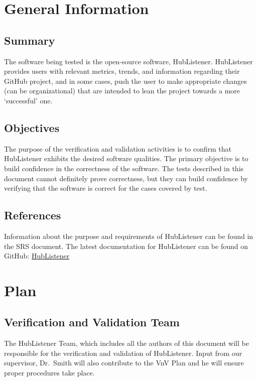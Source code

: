 \documentclass[12pt, titlepage]{article}
\begin{document}
\section{General Information}

\subsection{Summary}
The software being tested is the open-source software, HubListener.  HubListener provides users with relevant metrics, trends, and
information regarding their GitHub project, and in some cases, push the user to make appropriate changes (can be organizational) that are intended to lean the project towards a more `successful' one.

\subsection{Objectives}
The purpose of the verification and validation activities is to confirm that HubListener exhibits the desired software qualities. The primary objective is to build confidence in the correctness of the software. The tests described in this document cannot definitely prove correctness, but they can build confidence by verifying that the software is correct for the cases covered by test. 
\subsection{References}

Information about the purpose and requirements of HubListener can be found in the SRS document. The latest documentation for HubListener can be found on GitHub:  \href{https://github.com/pjmc-oliveira/HubListener/}{HubListener}

\section{Plan}

\subsection{Verification and Validation Team}

The HubListener Team, which includes all the authors of this document will be responsible for the verification and validation of HubListener. Input from our supervisor, Dr.~Smith will also contribute to the VnV Plan and he will ensure proper procedures take place. 
\end{document}
